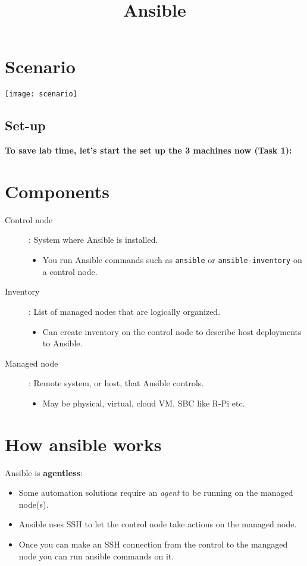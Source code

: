 \documentclass[slides]{pgnotes}
\title{Ansible}
\begin{document}
\maketitle

\tableofcontents

\section{Scenario}

\begin{center}
  \texttt{[image: scenario]}
\end{center}


\subsection{Set-up}

\textbf{To save lab time, let's start the set up the 3 machines now (Task 1):}

\section{Components}

\begin{description}
\item[Control node]: System where Ansible is installed.
  \begin{itemize}
  \item You run Ansible commands such as \texttt{ansible} or \texttt{ansible-inventory} on a control node.
  \end{itemize}
  
\item[Inventory]: List of managed nodes that are logically organized.
  \begin{itemize}
  \item Can create inventory on the control node to describe host deployments to Ansible.
  \end{itemize}

\item[Managed node]: Remote system, or host, that Ansible controls.
  \begin{itemize}
  \item May be physical, virtual, cloud VM, SBC like R-Pi etc.
  \end{itemize}

\end{description}

\section{How ansible works}

Ansible is \textbf{agentless}:
\begin{itemize}
\item Some automation solutions require an \textit{agent} to be running on the managed node(s).
\item Ansible uses SSH to let the control node take actions on the managed node.
\item Once you can make an SSH connection from the control to the mangaged node you can run ansible commands on it.
\end{itemize}
\end{document}
